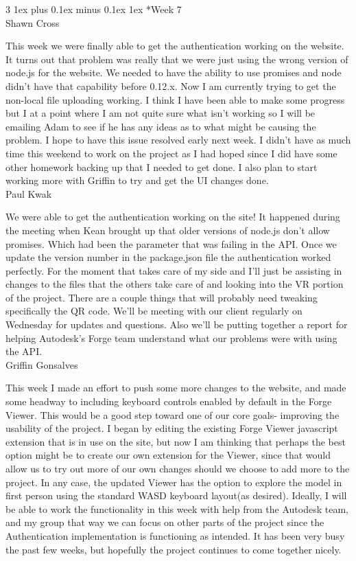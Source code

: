 \documentclass[letterpaper, 10pt, draftclsnofoot, compsoc, onecolumn]{IEEEtran}
\makeatletter
\def\subsubsection{\@startsection{subsubsection}%
                                 {3}%
                                 {\z@}%
                                 {1ex plus 0.1ex minus 0.1ex}%
                                 {1ex}%
                                 {\normalfont\normalsize}}%
\makeatother
\begin{document}
\subsubsection*{Week 7}\hspace*{\fill} \\ 
Shawn Cross

This week we were finally able to get the authentication working on the website. It turns out that problem was really that we were just using the wrong version of node.js for the website. We needed to have the ability to use promises and node didn't have that capability before 0.12.x. Now I am currently trying to get the non-local file uploading working. I think I have been able to make some progress but I at a point where I am not quite sure what isn't working so I will be emailing Adam to see if he has any ideas as to what might be causing the problem. I hope to have this issue resolved early next week. I didn't have as much time this weekend to work on the project as I had hoped since I did have some other homework backing up that I needed to get done. I also plan to start working more with Griffin to try and get the UI changes done.\\

Paul Kwak

We were able to get the authentication working on the site! It happened during the meeting when Kean brought up that older versions of node.js don't allow promises. Which had been the parameter that was failing in the API. Once we update the version number in the package.json file the authentication worked perfectly. For the moment that takes care of my side and I'll just be assisting in changes to the files that the others take care of and looking into the VR portion of the project. There are a couple things that will probably need tweaking specifically the QR code. We'll be meeting with our client regularly on Wednesday for updates and questions. Also we'll be putting together a report for helping Autodesk's Forge team understand what our problems were with using the API.\\

Griffin Gonsalves

This week I made an effort to push some more changes to the website, and made some headway to including keyboard controls enabled by default in the Forge Viewer. This would be a good step toward one of our core goals- improving the usability of the project. I began by editing the existing Forge Viewer javascript extension that is in use on the site, but now I am thinking that perhaps the best option might be to create our own extension for the Viewer, since that would allow us to try out more of our own changes should we choose to add more to the project. In any case, the updated Viewer has the option to explore the model in first person using the standard WASD keyboard layout(as desired). Ideally, I will be able to work the functionality in this week with help from the Autodesk team, and my group that way we can focus on other parts of the project since the Authentication implementation is functioning as intended. It has been very busy the past few weeks, but hopefully the project continues to come together nicely.\\
\end{document}
